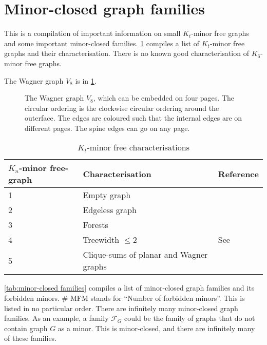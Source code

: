 \section{Minor-closed graph families}\label{sec:minor_closed_families}
This is a compilation of important information on small $K_t$-minor free graphs and some important minor-closed families. \cref{tab:kt_minor_free} compiles a list of $K_t$-minor free graphs and their characterisation. There is no known good characterisation of $K_6$-minor free graphs. 

The Wagner graph $V_8$ is in \cref{fig:wagner}. 
\begin{figure}[h!]
	\centering
	\begin{tikzpicture}[thick,scale=1.5, every node/.style={scale=2}]
		
	\end{tikzpicture}
	\caption[Wagner graph]{The Wagner graph $V_8$, which can be embedded on four pages. The circular ordering is the clockwise circular ordering around the outerface. The edges are coloured such that the internal edges are on different pages. The spine edges can go on any page.}\label{fig:wagner}
\end{figure}

\begin{table}[h!]
    \centering
    \caption{$K_t$-minor free characterisations}\label{tab:kt_minor_free}
    \begin{tabular*}{\textwidth}{@{}lll@{}}
        \toprule
        $K_n$-minor free-graph  & Characterisation  & Reference \\
        \midrule
        1                       & Empty graph       &           \\
        2                       & Edgeless graph    &           \\
        3                       & Forests           &           \\
        4                       & Treewidth $\leq 2$&  See {\textcite{norinMath599GraphMinors2017}}         \\
        5                       & Clique-sums of planar and Wagner graphs & {\textcite{wagnerUeberEigenschaftEbenen1937}}\\
        \bottomrule
    \end{tabular*}
\end{table}

\cref{tab:minor-closed families} compiles a list of minor-closed graph families and its forbidden minors. \# MFM stands for ``Number of forbidden minors''.
This is listed in no particular order. There are infinitely many minor-closed graph families. As an example, a family $\mathcal{F}_G$ could be the family of graphs that do not contain graph $G$ as a minor. This is minor-closed, and there are infinitely many of these families.

